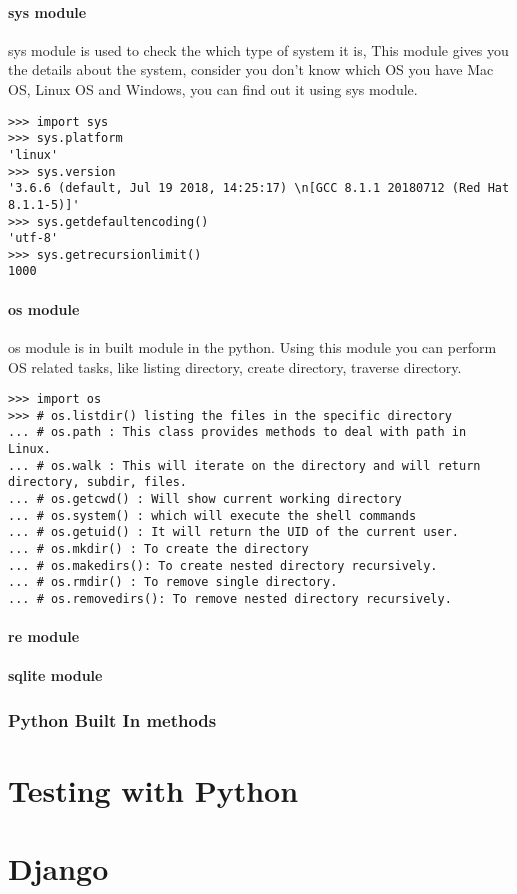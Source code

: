 \documentclass[letterpaper,12pt]{book}
\begin{document}
\subsection{sys module}
sys module is used to check the which type of system it is, This module gives you the details about the system, consider you don't know which OS you have Mac OS, Linux OS and Windows, you can find out it using sys module.
\begin{lstlisting}
>>> import sys
>>> sys.platform
'linux'
>>> sys.version
'3.6.6 (default, Jul 19 2018, 14:25:17) \n[GCC 8.1.1 20180712 (Red Hat 8.1.1-5)]'
>>> sys.getdefaultencoding()
'utf-8'
>>> sys.getrecursionlimit()
1000
\end{lstlisting}
\subsection{os module}
os module is in built module in the python. Using this module you can perform OS related tasks, like listing directory, create directory, traverse directory.
\begin{lstlisting}
>>> import os
>>> # os.listdir() listing the files in the specific directory
... # os.path : This class provides methods to deal with path in Linux.
... # os.walk : This will iterate on the directory and will return directory, subdir, files.
... # os.getcwd() : Will show current working directory
... # os.system() : which will execute the shell commands
... # os.getuid() : It will return the UID of the current user.
... # os.mkdir() : To create the directory
... # os.makedirs(): To create nested directory recursively.
... # os.rmdir() : To remove single directory.
... # os.removedirs(): To remove nested directory recursively.

\end{lstlisting}
\subsection{re module}
\subsection{sqlite module}
\section{Python Built In methods}
\part{Testing with Python}
\part{Django}
\end{document}
